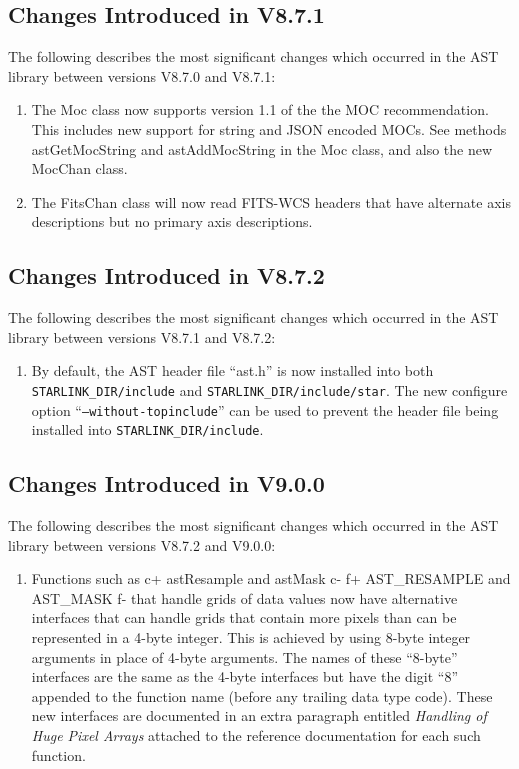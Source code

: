 \documentclass[twoside,11pt]{starlink}
\begin{document}
\subsection{Changes Introduced in V8.7.1}
The following describes the most significant changes which
occurred in the AST library between versions V8.7.0 and V8.7.1:

\begin{enumerate}

\item The Moc class now supports version 1.1 of the the MOC recommendation.
This includes new support for string and JSON encoded MOCs. See methods
astGetMocString and astAddMocString in the Moc class, and also the new
MocChan class.

\item The FitsChan class will now read FITS-WCS headers that have
alternate axis descriptions but no primary axis descriptions.

\end{enumerate}

\subsection{Changes Introduced in V8.7.2}
The following describes the most significant changes which
occurred in the AST library between versions V8.7.1 and V8.7.2:

\begin{enumerate}

\item By default, the AST header file ``ast.h'' is now installed into both
\texttt{STARLINK\_DIR/include} and \texttt{STARLINK\_DIR/include/star}. The
new configure option ``\texttt{--without-topinclude}'' can be used to prevent
the header file being installed into \texttt{STARLINK\_DIR/include}.


\end{enumerate}

\subsection{Changes Introduced in V9.0.0}
The following describes the most significant changes which
occurred in the AST library between versions V8.7.2 and V9.0.0:

\begin{enumerate}
\item Functions such as
c+
astResample and astMask
c-
f+
AST\_RESAMPLE and AST\_MASK
f-
that handle grids of data values now have alternative interfaces that can
handle grids that contain more pixels than can be represented in a 4-byte
integer. This is achieved by using 8-byte integer arguments in place of
4-byte arguments. The names of these ``8-byte'' interfaces are the same
as the 4-byte interfaces but have the digit ``8'' appended to the
function name (before any trailing data type code). These new interfaces
are documented in an extra paragraph entitled \emph{Handling of Huge
Pixel Arrays} attached to the reference documentation for each such
function.

\end{enumerate}
\end{document}
